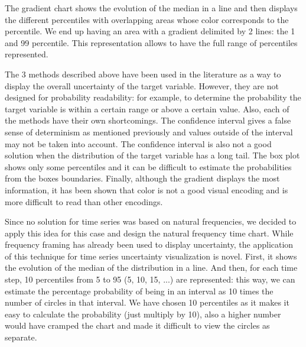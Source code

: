\documentclass[a4paper,3p,sort&compress]{elsarticle}
\begin{document}
The gradient chart shows the evolution of the median in a line and then displays the different percentiles
with overlapping areas whose color corresponds to the percentile. We end up having an area with a gradient 
delimited by 2 lines: the 1 and 99 percentile. This representation allows to have the
 full range of percentiles represented.

The 3 methods described above have been used in the literature as a way to display the overall uncertainty 
of the target variable. However, they are not designed for probability readability: for example, to determine 
the probability the target variable is within a certain range or above a certain value. Also,
each of the methods have their own shortcomings. The confidence interval gives a false sense of determinism as mentioned previously
and values outside of the interval may not be taken into account. The confidence interval is also not a good solution 
when the distribution of the target variable has a long tail. The box plot shows only some percentiles and it can be difficult to 
estimate the probabilities from the boxes boundaries. Finally, although the gradient displays the most information, it has been 
shown \cite{cleveland_graphical_1984} that color is not 
a good visual encoding and is more difficult to read than other encodings.

Since no solution for time series was based on natural frequencies, we decided to apply this idea for this case 
and design the natural frequency time chart.
While frequency framing has already been used to display uncertainty, the application of this technique for time series 
uncertainty visualization is novel. First, 
it shows the evolution of the median of the distribution in a line. And then, for each time 
step, 10 percentiles from 5 to 95 (5, 10, 15, ...) are represented: this way, we can estimate the percentage 
probability of being in an interval as 10 times the number of circles in that interval. 
We have chosen 10 percentiles as it makes it easy to calculate the probability (just multiply by 10), also a higher number
would have cramped the chart and made it difficult to view the circles as separate. 
\end{document}
